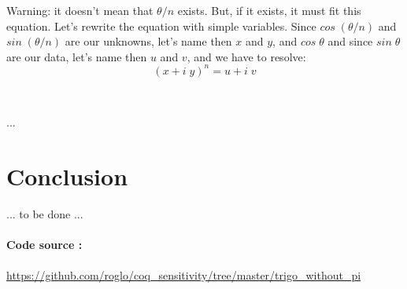 \documentclass[11pt]{article}
\theoremstyle{definition}
\begin{document}
Warning: it doesn't mean that $\theta / n$ exists. But, if it exists,
it must fit this equation. Let's rewrite the equation with simple
variables. Since $cos\;(\theta/n)$ and $sin\;(\theta/n)$ are our
unknowns, let's name then $x$ and $y$, and $cos\;\theta$ and since
$sin\;\theta$ are our data, let's name then $u$ and $v$, and we have
to resolve:
\[
(x + i \; y)^n = u + i \; v
\]

\

...

\section{Conclusion}

... to be done ...

\paragraph{Code source :}
\url{https://github.com/roglo/coq_sensitivity/tree/master/trigo_without_pi}
\end{document}
